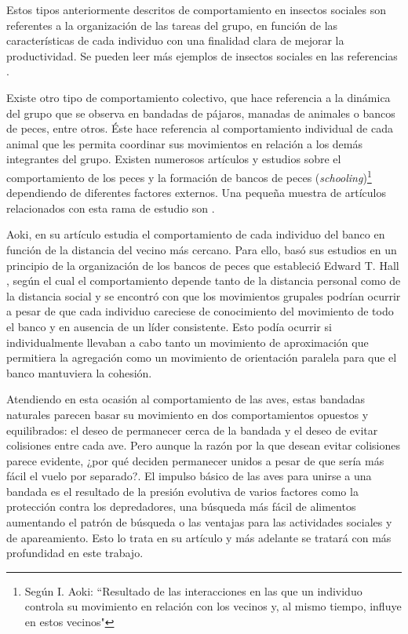 Estos tipos anteriormente descritos de comportamiento en insectos sociales son referentes a la organización de las tareas del grupo, en función de las características de cada individuo con una finalidad clara de mejorar la productividad. Se pueden leer más ejemplos de insectos sociales en las referencias \cite{csahin2004swarm,robinson1992regulation}. 

Existe otro tipo de comportamiento colectivo, que hace referencia a la dinámica del grupo que se observa en bandadas de pájaros, manadas de animales o bancos de peces, entre otros. Éste hace referencia al comportamiento individual de cada animal que les permita coordinar sus movimientos en relación a los demás integrantes del grupo. Existen numerosos artículos y estudios sobre el comportamiento de los peces y la formación de bancos de peces (\textit{schooling})\footnote{Según I. Aoki: ``Resultado de las interacciones en las que un individuo controla su movimiento en relación con los vecinos y, al mismo tiempo, influye en estos vecinos"} dependiendo de diferentes factores externos. Una pequeña muestra de artículos relacionados con esta rama de estudio son \cite{aoki1982simulation, Aoki1984experimental,hall1910hidden,partridge1980sensory,partridge1980three,Pitcher963blindfish,youseff2008parallel}. 

Aoki, en su artículo \cite{aoki1982simulation} estudia el comportamiento de cada individuo del banco en función de la distancia del vecino más cercano. Para ello, basó sus estudios en un principio de la organización de los bancos de peces que estableció Edward T. Hall \cite{hall1910hidden}, según el cual el comportamiento depende tanto de la distancia personal como de la distancia social y se encontró con que los movimientos grupales podrían ocurrir a pesar de que cada individuo careciese de conocimiento del movimiento de todo el banco y en ausencia de un líder consistente. Esto podía ocurrir si individualmente llevaban a cabo tanto un movimiento de aproximación que permitiera la agregación como un movimiento de orientación paralela para que el banco mantuviera la cohesión.

Atendiendo en esta ocasión al comportamiento de las aves, estas bandadas naturales parecen basar su movimiento en dos comportamientos opuestos y equilibrados: el deseo de permanecer cerca de la bandada y el deseo de evitar colisiones entre cada ave. Pero aunque la razón por la que desean evitar colisiones parece evidente, ¿por qué deciden permanecer unidos a pesar de que sería más fácil el vuelo por separado?. El impulso básico de las aves para unirse a una bandada es el resultado de la presión evolutiva de varios factores como la protección contra los depredadores, una búsqueda más fácil de alimentos aumentando el patrón de búsqueda o las ventajas para las actividades sociales y de apareamiento. Esto lo trata \citeauthor{reynolds1987flocks} en su artículo \cite{reynolds1987flocks} y más adelante se tratará con más profundidad en este trabajo.

